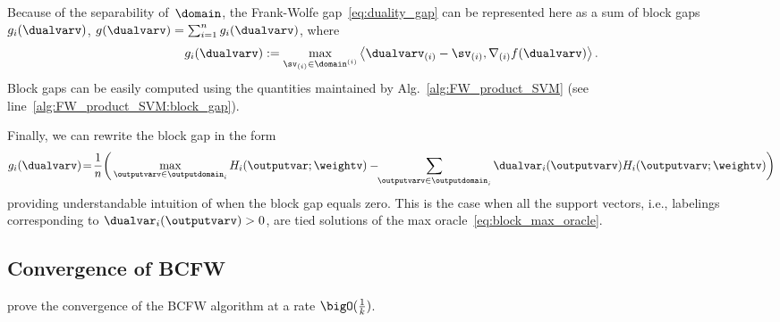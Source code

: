 \documentclass{article}
\begin{document}
Because of the separability of~$\domain$, the Frank-Wolfe gap~\eqref{eq:duality_gap} can be represented here as a sum of block gaps~$g_i(\dualvarv)$, $g(\dualvarv) = \sum_{i=1}^n g_i(\dualvarv)$, where 
\begin{equation}
\label{eq:block_gap}
g_i(\dualvarv) := \max_{\sv_{(i)}\in \domain^{(i)}} \left\langle\dualvarv_{(i)} - \sv_{(i)}, \nabla_{(i)} f(\dualvarv) \right\rangle.
\end{equation}
Block gaps can be easily computed using the quantities maintained by Alg.~\ref{alg:FW_product_SVM} (see line~\ref{alg:FW_product_SVM:block_gap}).

%
%
%
%
%
%
%
%



%


%
%
%
%
%
%
%
%
%
%

Finally, we can rewrite the block gap in the form
\begin{equation}\label{eq:duality_gap_withH}
g_i(\dualvarv)
\!=\!
\frac{1}{n}  \bigg(\max_{\outputvarv \in \outputdomain_i} H_i(\outputvar; \weightv) -\!\!\sum_{\outputvarv \in \outputdomain_i}\dualvar_i(\outputvarv)H_i(\outputvarv; \weightv)  \bigg)
\end{equation}
providing understandable intuition of when the block gap equals zero. This is the case when all the support vectors, i.e., labelings corresponding to  $\dualvar_i(\outputvarv) > 0$, are tied solutions of the max oracle~\eqref{eq:block_max_oracle}.







%
%
%

%
%
%
%
%
%
%
%
%
%
%
%
%
%
%
%
%
%
%
%
%
%
%
%
%
%
%
%
%
%
%

\subsection{Convergence of BCFW \label{sec:convergence_bcfw}}
\citet{lacosteJulien13bcfw} prove the convergence of the BCFW algorithm at a rate $\bigO(\frac{1}{k})$.
\end{document}
